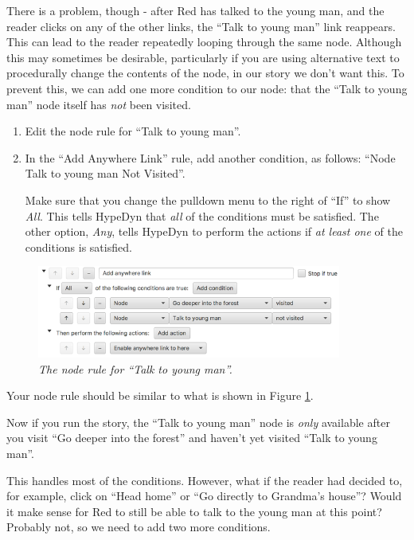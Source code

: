 \documentclass{article}
\begin{document}
There is a problem, though - after Red has talked to the young man, and the reader clicks on any of the other links, the ``Talk to young man'' link reappears. This can lead to the reader repeatedly looping through the same node. Although this may sometimes be desirable, particularly if you are using alternative text to procedurally change the contents of the node, in our story we don't want this. To prevent this, we can add one more condition to our node: that the ``Talk to young man'' node itself has \textit{not} been visited.

\begin{enumerate}
  \item Edit the node rule for ``Talk to young man''.
  \item In the ``Add Anywhere Link'' rule, add another condition, as follows: ``Node Talk to young man Not Visited''.

Make sure that you change the pulldown menu to the right of ``If'' to show \textit{All}. This tells HypeDyn that \textit{all} of the conditions must be satisfied. The other option, \textit{Any}, tells HypeDyn to perform the actions if \textit{at least one} of the conditions is satisfied.
\end{enumerate}

\begin{figure}[h]
  \centering
  \includegraphics[width=10cm]{images/hypedyn-tutorial-3-figure-6}
  \caption{\textit{The node rule for ``Talk to young man''.}}
  \label{fig:tut3:talk}
\end{figure} 

Your node rule should be similar to what is shown in Figure \ref{fig:tut3:talk}.

Now if you run the story, the ``Talk to young man'' node is \textit{only}
available after you visit ``Go deeper into the forest'' and haven't yet
visited ``Talk to young man''.

This handles most of the conditions. However, what if the reader had decided to, for example, click on ``Head home'' or ``Go directly to Grandma's house''? Would it make sense for Red to still be able to talk to the young man at this point? Probably not, so we need to add two more conditions.
\end{document}
